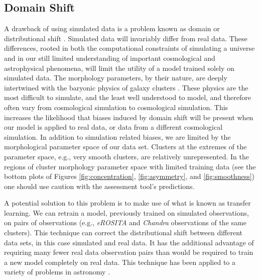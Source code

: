 \subsection{Domain Shift}\label{Domain Shift}
A drawback of using simulated data is a problem known as domain or distributional shift \cite[see section 7 of ][for a discussion]{Amodei_2016}. Simulated data will invariably differ from real data. These differences, rooted in both the computational constraints of simulating a universe and in our still limited understanding of important cosmological and astrophysical phenomena, will limit the utility of a model trained solely on simulated data. The morphology parameters, by their nature, are deeply intertwined with the baryonic physics of galaxy clusters \cite[e.g.,][]{Lau_2011, Lau_2012, Chen_2019, Fernando_2021}. These physics are the most difficult to simulate, and the least well understood to model, and therefore often vary from cosmological simulation to cosmological simulation. This increases the likelihood that biases induced by domain shift will be present when our model is applied to real data, or data from a different cosmological simulation. In addition to simulation related biases, we are limited by the morphological parameter space of our data set. Clusters at the extremes of the parameter space, e.g., very smooth clusters, are relatively unrepresented. In the regions of cluster morphology parameter space with limited training data (see the bottom plots of Figures \ref{fig:concentration}, \ref{fig:asymmetry}, and \ref{fig:smoothness}) one should use caution with the assessment tool's predictions. 

A potential solution to this problem is to make use of what is known as transfer learning. We can retrain a model, previously trained on simulated observations, on pairs of observations (e.g., \textit{eROSITA} and \textit{Chandra} observations of the same clusters). This technique can correct the distributional shift between different data sets, in this case simulated and real data. It has the additional advantage of requiring many fewer real data observation pairs than would be required to train a new model completely on real data. This technique has been applied to a variety of problems in astronomy \cite[e.g.,][]{Ackermann_2018, Dominguez_2019, Perez_Carrasco_2019}.


